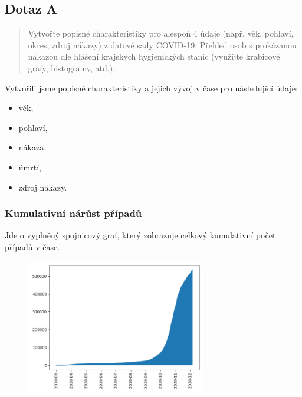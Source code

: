 \documentclass[11pt,a4paper,titlepage]{article}
\begin{document}
\subsection{Dotaz A}
\begin{quote}
Vytvořte popisné charakteristiky pro alespoň 4 údaje (např. věk, pohlaví, okres, zdroj nákazy) z datové sady COVID-19: Přehled osob s prokázanou nákazou dle hlášení krajských hygienických stanic (využijte krabicové grafy, histogramy, atd.).
\end{quote}

Vytvořili jsme popisné charakteristiky a jejich vývoj v čase pro následující údaje:
\begin{itemize}
    \item věk,
    \item pohlaví,
    \item nákaza,
    \item úmrtí,
    \item zdroj nákazy.
\end{itemize}

\newpage
\subsubsection{Kumulativní nárůst případů}
Jde o vyplněný spojnicový graf, který zobrazuje celkový kumulativní počet případů v čase.
\begin{figure}[h]
    \centering
    \includegraphics[width=0.70\textwidth]{img/cumulative_cases.png}
    \label{fig:cumulative_cases}
\end{figure}
\end{document}
